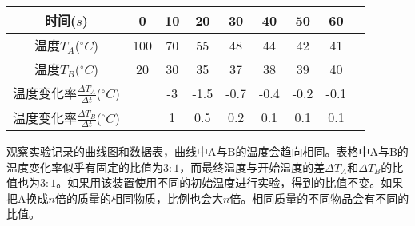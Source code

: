 \begin{tabular}{c|c|c|c|c|c|c|c|c}
\hline
时间($s$) & 0 & 10 & 20 & 30 & 40 & 50 & 60 \\ \hline
温度$T_A$($^\circ C$) & 100 & 70 & 55 & 48 & 44 & 42 & 41 \\ \hline
温度$T_B$($^\circ C$) & 20 & 30 & 35 & 37 & 38 & 39 & 40 \\ \hline
温度变化率$\frac{\Delta T_A}{\Delta t}$($^\circ C$) & & -3 & -1.5 & -0.7 & -0.4 & -0.2 & -0.1 \\ \hline
温度变化率$\frac{\Delta T_B}{\Delta t}$($^\circ C$) & & 1 & 0.5 & 0.2 & 0.1 & 0.1 & 0.1 \\ \hline
\end{tabular}

观察实验记录的曲线图和数据表，曲线中A与B的温度会趋向相同。表格中A与B的温度变化率似乎有固定的比值为$3:1$，而最终温度与开始温度的差$\Delta T_A$和$\Delta T_B$的比值也为$3:1$。如果用该装置使用不同的初始温度进行实验，得到的比值不变。如果把A换成$n$倍的质量的相同物质，比例也会大$n$倍。相同质量的不同物品会有不同的比值。
